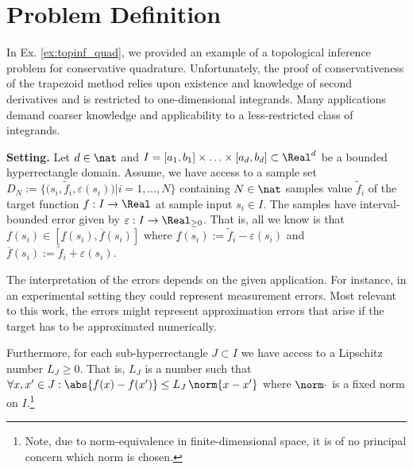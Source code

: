 

\section{Problem Definition}
\label{sec:prob_def}
In Ex. \ref{ex:topinf_quad}, we provided an example of a topological inference problem for conservative quadrature. Unfortunately, the proof of conservativeness of the trapezoid method relies upon existence and knowledge of second derivatives and is restricted to one-dimensional integrands. Many applications demand coarser knowledge and applicability to a less-restricted class of integrands. 



\textbf{Setting.}
Let $d \in \nat$ and $I=[a_1,b_1] \times \ldots \times [a_d,b_d] \subset \Real^d$ be a bounded hyperrectangle domain. Assume, we have access to a sample set $D_N:= \{\bigl( s_i, \tilde f_i, \varepsilon(s_i) \bigr) \vert i=1,\ldots, N \} $ containing $N \in \nat$ samples value $\tilde f_i$ of the target function $f: I \to \Real$ at sample input $s_i \in I$. The samples have interval-bounded error given by $\varepsilon : I \to \Real_{\geq 0}$. That is, all we know is that $f(s_i) \in [\underline f(s_i), \overline f(s_i) ]$ where $\underline f(s_i) := \tilde f_i - \varepsilon(s_i)$ and $\overline f(s_i) := \tilde f_i + \varepsilon(s_i)$.

The interpretation of the errors depends on the given application. For instance, in an experimental setting they could represent measurement errors. Most relevant to this work, the errors might represent approximation errors that arise if the target has to be approximated numerically.

Furthermore, for each sub-hyperrectangle $J \subset I$ we have access to a Lipschitz number $L_J \geq 0$. That is, $L_J$ is a number such that $\forall x,x' \in J: \abs{f(x) - f(x')} \leq L_J \, \norm{ x- x'}$ where $\norm \cdot$ is a fixed norm on $I$.\footnote{Note, due to norm-equivalence in finite-dimensional space, it is of no principal concern which norm is chosen.} 

